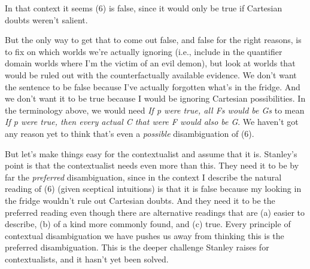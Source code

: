 \noindent In that context it seems (6) is false, since it would only be true if Cartesian doubts weren't salient.


\noindent But the only way to get that to come out false, and false for the right reasons, is to fix on which worlds we're actually ignoring (i.e., include in the quantifier domain worlds where I'm the victim of an evil demon), but look at worlds that would be ruled out with the counterfactually available evidence. We don't want the sentence to be false because I've actually forgotten what's in the fridge. And we don't want it to be true because I would be ignoring Cartesian possibilities. In the terminology above, we would need \textit{If p were true, all Fs would be Gs} to mean \textit{If p were true, then every actual C that were F would also be G}. We haven't got any reason yet to think that's even a \textit{possible} disambiguation of (6). 

But let's make things easy for the contextualist and assume that it is. Stanley's point is that the contextualist needs even more than this. They need it to be by far the  \textit{preferred} disambiguation, since in the context I describe the natural reading of (6) (given sceptical intuitions) is that it is false because my looking in the fridge wouldn't rule out Cartesian doubts. And they need it to be the preferred reading even though there are alternative readings that are (a) easier to describe, (b) of a kind more commonly found, and (c) true. Every principle of contextual disambiguation we have pushes us away from thinking this is the preferred disambiguation. This is the deeper challenge Stanley raises for contextualists, and it hasn't yet been solved.